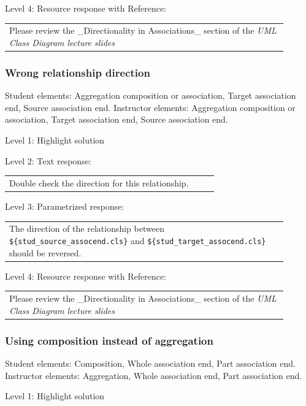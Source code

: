 \noindent Level 4: Resource response with Reference: \medskip

\begin{tabular}{|p{0.9\linewidth}}
Please review the _Directionality in Associations_ section of the \textit{UML Class Diagram lecture slides}
\end{tabular} \medskip


\subsubsection{Wrong relationship direction}

Student elements: Aggregation composition or association, Target association end, Source association end. Instructor elements: Aggregation composition or association, Target association end, Source association end. \medskip

\noindent Level 1: Highlight solution  \medskip

\noindent Level 2: Text response: \medskip

\begin{tabular}{|p{0.9\linewidth}}
Double check the direction for this relationship.
\end{tabular} \medskip

\noindent Level 3: Parametrized response: \medskip

\begin{tabular}{|p{0.9\linewidth}}
The direction of the relationship between \verb|${stud_source_assocend.cls}| and \verb|${stud_target_assocend.cls}| should be reversed.
\end{tabular} \medskip

\noindent Level 4: Resource response with Reference: \medskip

\begin{tabular}{|p{0.9\linewidth}}
Please review the _Directionality in Associations_ section of the \textit{UML Class Diagram lecture slides}
\end{tabular} \medskip


\subsubsection{Using composition instead of aggregation}

Student elements: Composition, Whole association end, Part association end. Instructor elements: Aggregation, Whole association end, Part association end. \medskip

\noindent Level 1: Highlight solution  \medskip


